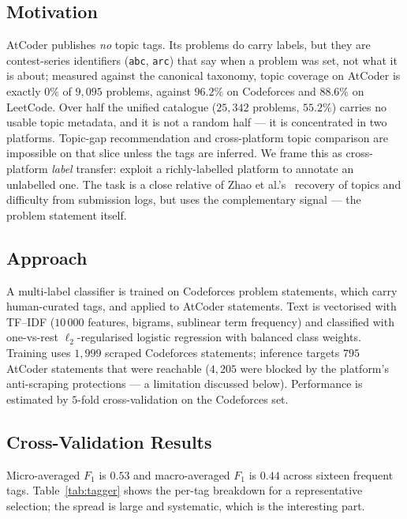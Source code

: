 \documentclass[12pt,a4paper]{article}
\begin{document}
\subsection{Motivation}
AtCoder publishes \emph{no} topic tags. Its problems do carry labels, but they are
contest-series identifiers (\texttt{abc}, \texttt{arc}) that say when a problem was set,
not what it is about; measured against the canonical taxonomy, topic coverage on AtCoder
is exactly $0\%$ of $9{,}095$ problems, against $96.2\%$ on Codeforces and $88.6\%$ on
LeetCode. Over half the unified catalogue ($25{,}342$ problems, $55.2\%$) carries no usable topic
metadata, and it is not a random half --- it is concentrated in two platforms. Topic-gap
recommendation and cross-platform topic comparison are impossible on that slice unless
the tags are inferred. We frame this as cross-platform \emph{label} transfer: exploit a
richly-labelled platform to annotate an unlabelled one. The task is a close relative of
Zhao et al.'s~\cite{zhao2018} recovery of topics and difficulty from submission logs,
but uses the complementary signal --- the problem statement itself.

\subsection{Approach}
A multi-label classifier is trained on Codeforces problem statements, which carry
human-curated tags, and applied to AtCoder statements. Text is vectorised with TF--IDF
($10\,000$ features, bigrams, sublinear term frequency) and classified with one-vs-rest
$\ell_2$-regularised logistic regression with balanced class weights. Training uses
$1{,}999$ scraped Codeforces statements; inference targets $795$ AtCoder statements that
were reachable ($4{,}205$ were blocked by the platform's anti-scraping protections --- a
limitation discussed below). Performance is estimated by $5$-fold cross-validation on the
Codeforces set.

\subsection{Cross-Validation Results}
Micro-averaged $F_1$ is $0.53$ and macro-averaged $F_1$ is $0.44$ across sixteen
frequent tags. Table~\ref{tab:tagger} shows the per-tag breakdown for a representative
selection; the spread is large and systematic, which is the interesting part.
\end{document}
